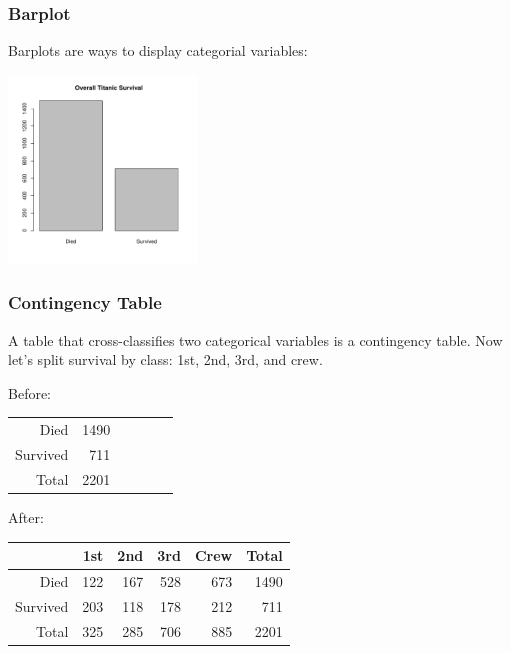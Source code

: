 \documentclass[handout]{beamer}
\newcommand{\blue}[1]{\textcolor{blue2}{#1}}
\begin{document}
\begin{frame}[fragile]
\frametitle{Barplot}
\blue{Barplots} are ways to display categorial variables:

\begin{center}
\includegraphics[width=5cm]{figure/barplot.pdf}
\end{center}


\end{frame}


\begin{frame}[fragile]
\frametitle{Contingency Table}
A table that \blue{cross-classifies} two categorical variables is a \blue{contingency table}.  Now let's split survival by class: 1st, 2nd, 3rd, and crew.

\pause \vspace{0.25cm}

Before:
\begin{center}
\begin{tabular}{r|rrrr|r}
Died & 1490 \\
  Survived & 711 \\  
   \hline
  Total & 2201 \\
\end{tabular}
\end{center}

After:
\begin{center}
\begin{tabular}{r|rrrr|r}
 & 1st & 2nd & 3rd & Crew & Total \\ 
  \hline
Died & 122 & 167 & 528 & 673 & 1490 \\ 
  Survived & 203 & 118 & 178 & 212 & 711 \\ 
   \hline
  Total & 325 & 285 & 706 & 885 & 2201 \\ 
\end{tabular}
\end{center}
  
\end{frame}
\end{document}
